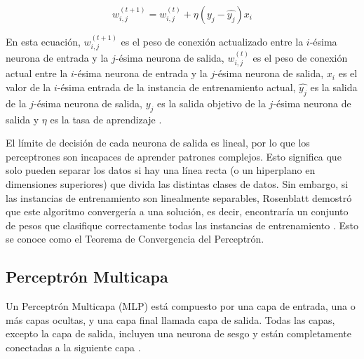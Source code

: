 \begin{equation}
w_{i,j}^{(t+1)} = w_{i,j}^{(t)} + \eta (y_j - \hat{y_j}) x_i
\label{eq:perceptron_learning_rule}
\end{equation}

En esta ecuación, $w_{i,j}^{(t+1)}$ es el peso de conexión actualizado entre la $i$-ésima neurona de entrada y la $j$-ésima neurona de salida, $w_{i,j}^{(t)}$ es el peso de conexión actual entre la $i$-ésima neurona de entrada y la $j$-ésima neurona de salida, $x_i$ es el valor de la $i$-ésima entrada de la instancia de entrenamiento actual, $\hat{y_j}$ es la salida de la $j$-ésima neurona de salida, $y_j$ es la salida objetivo de la $j$-ésima neurona de salida y $\eta$ es la tasa de aprendizaje \citep{geron2022hands}.


El límite de decisión de cada neurona de salida es lineal, por lo que los perceptrones son incapaces de aprender patrones complejos. Esto significa que solo pueden separar los datos si hay una línea recta (o un hiperplano en dimensiones superiores) que divida las distintas clases de datos. Sin embargo, si las instancias de entrenamiento son linealmente separables, Rosenblatt demostró que este algoritmo convergería a una solución, es decir, encontraría un conjunto de pesos que clasifique correctamente todas las instancias de entrenamiento \citep{geron2022hands}. Esto se conoce como el Teorema de Convergencia del Perceptrón.



\subsection{Perceptrón Multicapa}

Un Perceptrón Multicapa (MLP) está compuesto por una capa de entrada, una o más capas ocultas, y una capa final llamada capa de salida. Todas las capas, excepto la capa de salida, incluyen una neurona de sesgo y están completamente conectadas a la siguiente capa \citep{geron2022hands}.

